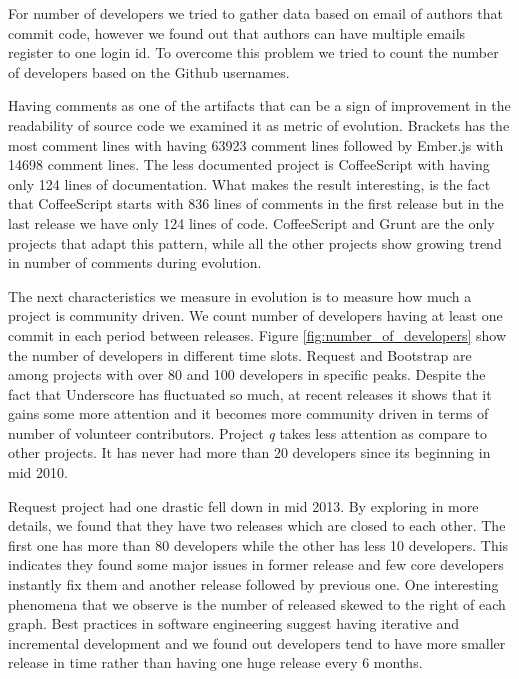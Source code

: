 \par For number of developers we tried to gather data based on email of authors that commit code, however we found out that authors can have multiple emails register to one login id. To overcome this problem we tried to count the number of developers based on the Github usernames. 

\par
Having comments as one of the artifacts that can be a sign of improvement in the readability of source code we examined it as metric of evolution.
Brackets has the most comment lines with having 63923 comment lines followed by Ember.js with 14698 comment lines. The less documented project is CoffeeScript with having only 124 lines of documentation. What makes the result interesting, is the fact that CoffeeScript starts with 836 lines of comments in the first release but in the last release we have only 124 lines of code. CoffeeScript and Grunt are the only projects that adapt this pattern, while all the other projects show growing trend in number of comments during evolution.  

The next characteristics we measure in evolution is to measure how much a project is community driven. We count number of developers having at least one commit in each period between releases. Figure \ref{fig:number_of_developers} show the number of developers in different time slots. Request and Bootstrap are among projects with over 80 and 100 developers in specific peaks. Despite the fact that Underscore has fluctuated so much, at recent releases it shows that it gains some more attention and it becomes more community driven in terms of number of volunteer contributors. Project \textit{q} takes less attention as compare to other projects. It has never had more than 20 developers since its beginning in mid 2010.
\par
Request project had one drastic fell down in mid 2013. By exploring in more details, we found that they have two releases which are closed to each other. The first one has more than 80 developers while the other has less 10 developers. This indicates they found some major issues in former release and few core developers instantly fix them and another release followed by previous one. One interesting phenomena that we observe is the number of released skewed to the right of each graph. Best practices in software engineering suggest having iterative and incremental development and we found out developers tend to have more smaller release in time rather than having one huge release every 6 months.  

